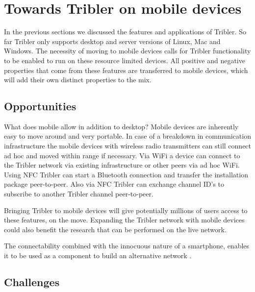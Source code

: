 \section{Towards Tribler on mobile devices}\label{ch:tribler_mobile}

In the previous sections we discussed the features and applications of Tribler.
So far Tribler only supports desktop and server versions of Linux, Mac and Windows.
The necessity of moving to mobile devices calls for Tribler functionality to be enabled to run on these resource limited devices.
All positive and negative properties that come from these features are transferred to mobile devices, which will add their own distinct properties to the mix.



\subsection{Opportunities}

What does mobile allow in addition to desktop?
Mobile devices are inherently easy to move around and very portable.
In case of a breakdown in communication infrastructure the mobile devices with wireless radio transmitters can still connect ad hoc and moved within range if necessary.
Via WiFi a device can connect to the Tribler network via existing infrastructure or other peers via ad hoc WiFi.
Using NFC Tribler can start a Bluetooth connection and transfer the installation package peer-to-peer.
Also via NFC Tribler can exchange channel ID's to subscribe to another Tribler channel peer-to-peer.

Bringing Tribler to mobile devices will give potentially millions of users access to these features, on the move.
Expanding the Tribler network with mobile devices could also benefit the research that can be performed on the live network.

The connectability combined with the  innocuous nature of a smartphone, enables it to be used as a component to build an alternative network \cite{hasan2013dissent}.


\subsection{Challenges}

